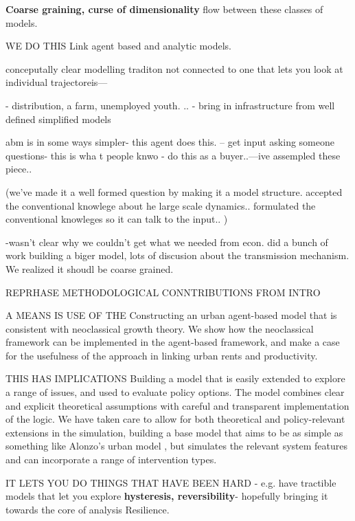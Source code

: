 \textbf{Coarse graining, curse of dimensionality}
flow between these classes of models.

WE DO THIS
Link agent based and analytic models.

conceputally clear modelling traditon not connected to one that lets you look at individual trajectoreis---

- distribution, a farm, unemployed youth. .. - bring in infrastructure from well defined simplified models

abm is in some ways simpler- this agent does this. 
-- get input asking someone questions- this is wha t people knwo - do this as a buyer..---ive assempled these piece..

(we've made it a well formed question by making it a model structure. accepted the conventional knowlege about he large scale dynamics..
formulated the conventional knowleges so it can talk to the input.. )


-wasn't clear why we couldn't get what we needed from econ.
did a bunch of work building a biger model, lots of discusion about the \gls{transmission mechanism}.
We realized it shoudl be coarse grained. 

REPRHASE METHODOLOGICAL CONNTRIBUTIONS FROM INTRO

A MEANS IS USE OF THE 
Constructing an urban \gls{agent-based model} that is consistent with {neoclassical growth theory}. We show how the neoclassical framework can be implemented in the agent-based framework, and make a case for the usefulness of the approach in linking urban rents and productivity. %

THIS HAS IMPLICATIONS
Building a model that is easily extended to explore a range of issues, and used to evaluate policy options. 
The model combines clear and explicit theoretical assumptions with careful and transparent implementation of the logic. %
We have taken care to allow for  both theoretical and policy-relevant extensions in the simulation,  building a base model that aims to be as simple as something like Alonzo's urban model \cite{alonsoLocationLandUse1964}, but 
simulates the relevant system features and can incorporate a range of intervention types. %


IT LETS YOU DO THINGS THAT HAVE BEEN HARD
- e.g. have tractible models that let you explore \textbf{hysteresis, reversibility}- hopefully bringing it towards the core of analysis
Resilience.

